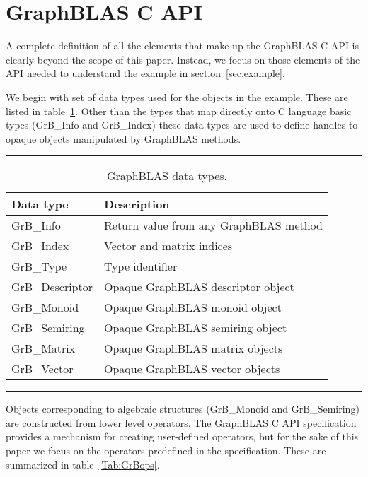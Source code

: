 \section{GraphBLAS C API}
\label{sec:Capi}

A complete definition of all the elements that make up the GraphBLAS C API
is clearly beyond the scope of this paper.  Instead, we focus on those
elements of the API needed to understand the example in section~\ref{sec:example}. 

We begin with set of data types used for the objects in the example.
These are listed in table~\ref{Tab:GrBdataTypes}.  Other than the types that map directly onto
C language basic types ({\sf GrB\_Info} and {GrB\_Index}) these data types
are used to define handles to opaque objects manipulated by GraphBLAS methods.
\begin{table}[h]
\hrule
\begin{center}
\caption{GraphBLAS data types.}
\label{Tab:GrBdataTypes}
\begin{tabular}{lp{5.25cm}}
Data type                         & Description  \\
\hline
	{\sf GrB\_Info}           & Return value from any GraphBLAS method \\
	{\sf GrB\_Index}          & Vector and matrix indices \\
	{\sf GrB\_Type}		  & Type identifier \\
	{\sf GrB\_Descriptor}     & Opaque GraphBLAS descriptor object \\
	{\sf GrB\_Monoid}         & Opaque GraphBLAS monoid object  \\
	{\sf GrB\_Semiring}       & Opaque GraphBLAS semiring object  \\
	{\sf GrB\_Matrix}         & Opaque GraphBLAS matrix objects \\
	{\sf GrB\_Vector}         & Opaque GraphBLAS vector objects \\
\end{tabular}
\end{center}
\hrule
\end{table}
Objects corresponding to algebraic structures ({\sf GrB\_Monoid} and {\sf GrB\_Semiring}) are constructed from lower level
operators. The GraphBLAS C API specification provides a mechanism for creating user-defined operators, but for the 
sake of this paper we focus on the operators predefined in the specification.  These are summarized
in table~\ref{Tab:GrBops}. 
